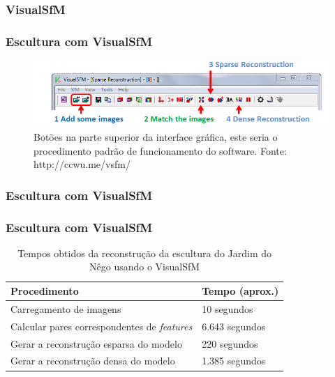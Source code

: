 \documentclass[table, usenames, svgnames, xcolor=dvipsnames]{beamer}
\begin{document}
\subsubsection{VisualSfM}

\begin{frame}
\frametitle{\textbf{Escultura com VisualSfM}}
	\begin{figure}[!h]
		\centering
		\includegraphics[width=1\linewidth]{figs/pipelinevisualsfm.png}
		\caption{%
		Botões na parte superior da interface gráfica, este seria o procedimento padrão de funcionamento do software.
		\tiny{Fonte: http://ccwu.me/vsfm/}
		}\label{fig:pipelineVisualSfM}
	\end{figure}
\end{frame}

\begin{frame}
\frametitle{\textbf{Escultura com VisualSfM}}
	\begin{center}
	\end{center}
\end{frame}

\begin{frame}
\frametitle{\textbf{Escultura com VisualSfM}}
	\begin{table}
	\caption{Tempos obtidos da reconstrução da escultura do Jardim do Nêgo usando o VisualSfM}
		\begin{tabular}{|l|p{3cm}|}
			\hline
			Procedimento & Tempo (aprox.) \\ \hline
			Carregamento de imagens & 10 segundos \\ \hline
			Calcular pares correspondentes de \emph{features} & 6.643 segundos \\ \hline
			Gerar a reconstrução esparsa do modelo & 220 segundos \\ \hline
			Gerar a reconstrução densa do modelo & 1.385 segundos \\ \hline
		\end{tabular}
	\end{table}
\end{frame}
\end{document}
